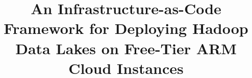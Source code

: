 \documentclass{singlecol-new}
\title{An Infrastructure-as-Code Framework for Deploying Hadoop Data Lakes on Free-Tier ARM Cloud Instances}
\begin{document}
\mostrarwordcount



\maketitle








\FloatBarrier




\end{document}
